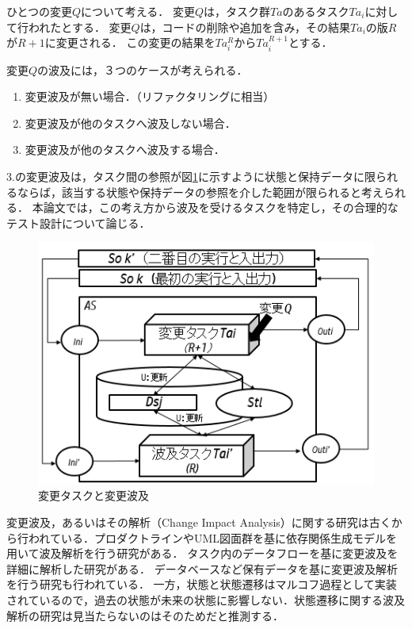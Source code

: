 \documentclass[a4paper,12pt]{jreport}
\begin{document}
ひとつの変更$Q$について考える．
変更$Q$は，タスク群$Ta$のあるタスク$Ta_i$に対して行われたとする．
変更$Q$は，コードの削除や追加を含み，その結果$Ta_i$の版$R$が$R+1$に変更される．
この変更の結果を$Ta^{R}_i$から$Ta^{R+1}_i$とする．

変更$Q$の波及には，３つのケースが考えられる．
\begin{enumerate}
  \item 変更波及が無い場合．（リファクタリングに相当）
  \item 変更波及が他のタスクへ波及しない場合．%
  \item 変更波及が他のタスクへ波及する場合．
\end{enumerate}

3.の変更波及は，タスク間の参照が図\ref{fig:fig-2}に示すように状態と保持データに限られるならば，該当する状態や保持データの参照を介した範囲が限られると考えられる．
本論文では，この考え方から波及を受けるタスクを特定し，その合理的なテスト設計について論じる．



\begin{figure}[b]
\begin{center}
\includegraphics[scale=0.5]{./image/fig-2.png}
\end{center}
\caption{変更タスクと変更波及}
\label{fig:fig-2}
\end{figure}

変更波及，あるいはその解析（Change Impact Analysis）に関する研究は古くから行われている．プロダクトラインやUML図面群を基に依存関係生成モデルを用いて波及解析を行う研究がある\cite{gomaa2005designing,briand2003impact,小谷正行2008}．
タスク内のデータフローを基に変更波及を詳細に解析した研究がある\cite{campbell1990}．
データベースなど保有データを基に変更波及解析を行う研究も行われている\cite{maule2008impact,加藤正恭2011}．
一方，状態と状態遷移はマルコフ過程として実装されているので，過去の状態が未来の状態に影響しない．状態遷移に関する波及解析の研究は見当たらないのはそのためだと推測する．%
\end{document}
